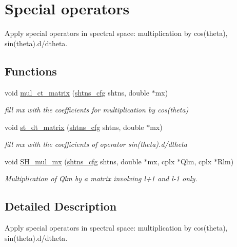\hypertarget{group__operators}{}\section{Special operators}
\label{group__operators}


Apply special operators in spectral space\+: multiplication by cos(theta), sin(theta).d/dtheta.  


\subsection*{Functions}
\begin{DoxyCompactItemize}
\item 
void \hyperlink{group__operators_gad51bd2c5d565a6a263d7b72d839dc956}{mul\+\_\+ct\+\_\+matrix} (\hyperlink{shtns_8h_ab7bd78e5cbeb4ed18782d018195fde00}{shtns\+\_\+cfg} shtns, double $\ast$mx)
\begin{DoxyCompactList}\small\item\em fill mx with the coefficients for multiplication by cos(theta) \end{DoxyCompactList}\item 
void \hyperlink{group__operators_gac53a7e27c628e0aae0f0a3177dc2663d}{st\+\_\+dt\+\_\+matrix} (\hyperlink{shtns_8h_ab7bd78e5cbeb4ed18782d018195fde00}{shtns\+\_\+cfg} shtns, double $\ast$mx)
\begin{DoxyCompactList}\small\item\em fill mx with the coefficients of operator sin(theta).d/dtheta \end{DoxyCompactList}\item 
void \hyperlink{group__operators_ga12bee435000620a1fc0d93ce27881bae}{S\+H\+\_\+mul\+\_\+mx} (\hyperlink{shtns_8h_ab7bd78e5cbeb4ed18782d018195fde00}{shtns\+\_\+cfg} shtns, double $\ast$mx, cplx $\ast$Qlm, cplx $\ast$Rlm)
\begin{DoxyCompactList}\small\item\em Multiplication of Qlm by a matrix involving l+1 and l-\/1 only. \end{DoxyCompactList}\end{DoxyCompactItemize}


\subsection{Detailed Description}
Apply special operators in spectral space\+: multiplication by cos(theta), sin(theta).d/dtheta. 



